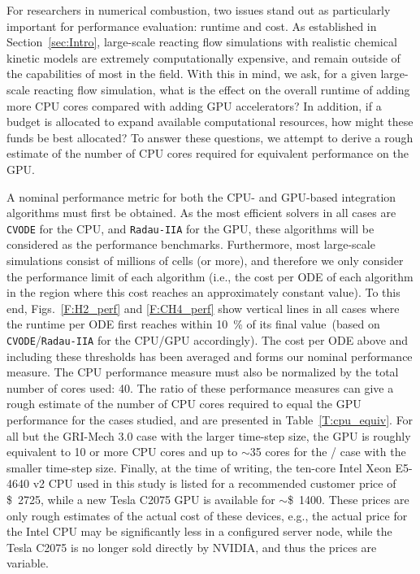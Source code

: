 \documentclass[preprint]{elsarticle}
\begin{document}
For researchers in numerical combustion, two issues stand out as particularly important for performance evaluation: runtime and cost.
As established in Section~\ref{sec:Intro}, large-scale reacting flow simulations with realistic chemical kinetic models are extremely computationally expensive, and remain outside of the capabilities of most in the field.
With this in mind, we ask, for a given large-scale reacting flow simulation, what is the effect on the overall runtime of adding more CPU cores compared with adding GPU accelerators?
In addition, if a budget is allocated to expand available computational resources, how might these funds be best allocated?
To answer these questions, we attempt to derive a rough estimate of the number of CPU cores required for equivalent performance on the GPU.

A nominal performance metric for both the CPU- and GPU-based integration algorithms must first be obtained.
As the most efficient solvers in all cases are \texttt{CVODE} for the CPU, and \texttt{Radau-IIA} for the GPU, these algorithms will be considered as the performance benchmarks.
Furthermore, most large-scale simulations consist of millions of cells (or more), and therefore we only consider the performance limit of each algorithm (i.e., the cost per ODE of each algorithm in the region where this cost reaches an approximately constant value).
To this end, Figs.~\ref{F:H2_perf} and \ref{F:CH4_perf} show vertical lines in all cases where the runtime per ODE first reaches within \SI{10}{\percent} of its final value~(based on \texttt{CVODE}\slash\texttt{Radau-IIA} for the CPU\slash GPU accordingly).
The cost per ODE above and including these thresholds has been averaged and forms our nominal performance measure.
The CPU performance measure must also be normalized by the total number of cores used: \num{40}.
The ratio of these performance measures can give a rough estimate of the number of CPU cores required to equal the GPU performance for the cases studied, and are presented in Table~\ref{T:cpu_equiv}.
For all but the GRI-Mech 3.0 case with the larger time-step size, the GPU is roughly equivalent to \num{10} or more CPU cores and up to $\sim$\num{35} cores for the \slash{} case with the smaller time-step size.
Finally, at the time of writing, the ten-core Intel Xeon E5-4640 v2 CPU used in this study is listed for a recommended customer price of \SI{2725}[\$]{}, while a new Tesla C2075 GPU is available for $\sim$\SI{1400}[\$]{}.
These prices are only rough estimates of the actual cost of these devices, e.g., the actual price for the Intel CPU may be significantly less in a configured server node, while the Tesla C2075 is no longer sold directly by NVIDIA, and thus the prices are variable.
\end{document}
